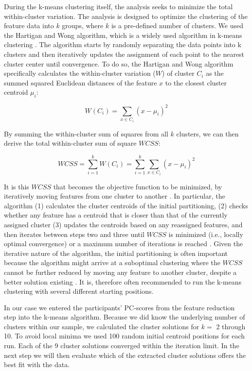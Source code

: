 During the k-means clustering itself, the analysis seeks to minimize the
total within-cluster variation. The analysis is designed to optimize the
clustering of the feature data into \(k\) groups, where \(k\) is a
pre-defined number of clusters. We used the Hartigan and Wong algorithm,
which is a widely used algorithm in k-means clustering
\citep{hartigan1979}. The algorithm starts by randomly separating the
data points into k clusters and then iteratively updates the assignment
of each point to the nearest cluster center until convergence. To do so,
the Hartigan and Wong algorithm specifically calculates the
within-cluster variation (\(W\)) of cluster \(C_i\) as the summed
squared Euclidean distances of the feature \(x\) to the closest cluster
centroid \(\mu_i\):

\begin{equation} \label{eq:kWCi}
  W(C_i) = \sum_{x \in C_i}(x-\mu_i)^2
\end{equation}

By summing the within-cluster sum of squares from all \(k\) clusters, we
can then derive the total within-cluster sum of square \(WCSS\):

\begin{equation} \label{eq:kWCSS}
  WCSS = \sum_{i=1}^k W(C_i) = \sum_{i=1}^k \sum_{x \in C_i} (x - \mu_i)^2
\end{equation}

It is this \(WCSS\) that becomes the objective function to be minimized,
by iteratively moving features from one cluster to another
\citep{hartigan1979}. In particular, the algorithm (1) calculates the
cluster centroids of the initial partitioning, (2) checks whether any
feature has a centroid that is closer than that of the currently
assigned cluster (3) updates the centroids based on any reassigned
features, and then iterates between steps two and three until \(WCSS\)
is minimized (i.e., locally optimal convergence) or a maximum number of
iterations is reached \citep{jain2010}. Given the iterative nature of
the algorithm, the initial partitioning is often important because the
algorithm might arrive at a suboptimal clustering where the \(WCSS\)
cannot be further reduced by moving any feature to another cluster,
despite a better solution existing
\citep[i.e., a local minimum;][]{timmerman2013}. It is, therefore often
recommended to run the k-means clustering with several different
starting positions.

In our case we entered the participants' PC-scores from the feature
reduction step into the k-means algorithm. Because we did know the
underlying number of clusters within our sample, we calculated the
cluster solutions for \(k =\) 2 through 10. To avoid local minima we
used 100 random initial centroid positions for each run. Each of the 9
cluster solutions converged within the iteration limit. In the next step
we will then evaluate which of the extracted cluster solutions offers
the best fit with the data.
